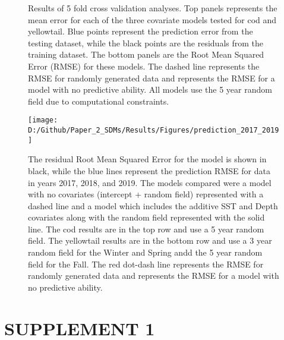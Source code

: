 \documentclass[
]{article}
\begin{document}
\begin{landscape}
\begin{figure}[htb]
\caption{Results of 5 fold cross validation analyses. Top panels represents the mean error for each of the three covariate models tested for cod and yellowtail. Blue points represent the prediction error from the testing dataset, while the black points are the residuals from the training dataset. The bottom panels are the Root Mean Squared Error (RMSE) for these models.  The dashed line represents the RMSE for randomly generated data and represents the RMSE for a model with no predictive ability. All models use the 5 year random field due to computational constraints.}\label{fig:folds}
\end{figure}

\newpage
\begin{figure}[htb]

{\centering \texttt{[image: D:/Github/Paper\_2\_SDMs/Results/Figures/prediction\_2017\_2019]} 

}

\caption{The residual Root Mean Squared Error for the model is shown in black, while the blue lines represent the prediction RMSE for data in years 2017, 2018, and 2019. The models compared were a model with no covariates (intercept + random field) represented with a dashed line and a model which includes the additive SST and Depth covariates along with the random field represented with the solid line.  The cod results are in the top row and use a 5 year random field. The yellowtail results are in the bottom row and use a 3 year random field for the Winter and Spring andd the 5 year random field for the Fall. The red dot-dash line represents the RMSE for randomly generated data and represents the RMSE for a model with no predictive ability.}\label{fig:pred-17-19}
\end{figure}

\end{landscape}

\newpage

\hypertarget{ref-sup}{%
\section{SUPPLEMENT 1}\label{ref-sup}}

\setcounter{table}{0}  \renewcommand{\thetable}{S\arabic{table}} \setcounter{figure}{0} \renewcommand{\thefigure}{S\arabic{figure}}
\end{document}
